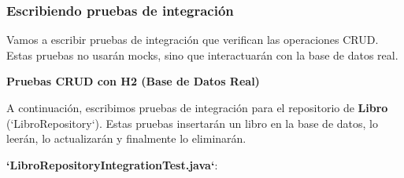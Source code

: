\documentclass[11pt]{article}
\begin{document}
\subsubsection{Escribiendo pruebas de integración}
\label{sec:orgc5b8d07}
Vamos a escribir pruebas de integración que verifican las operaciones CRUD. Estas pruebas no usarán mocks, sino que interactuarán con la base de datos real.

\textbf{\textbf{Pruebas CRUD con H2 (Base de Datos Real)}}

A continuación, escribimos pruebas de integración para el repositorio de \textbf{\textbf{Libro}} (`LibroRepository`). Estas pruebas insertarán un libro en la base de datos, lo leerán, lo actualizarán y finalmente lo eliminarán.

\textbf{\textbf{`LibroRepositoryIntegrationTest.java`}}:
\end{document}

